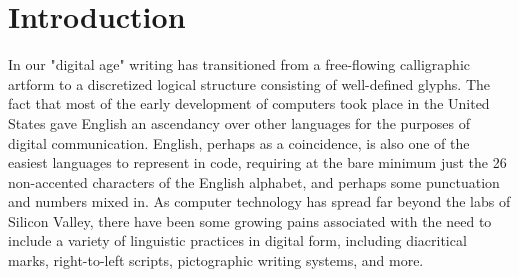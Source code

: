 \section{Introduction}

In our "digital age" writing has transitioned from a free-flowing calligraphic
artform to a discretized logical structure consisting of well-defined glyphs.
The fact that most of the early development of computers took place in the
United States gave English an ascendancy over other languages for the purposes
of digital communication. English, perhaps as a coincidence, is also one of the
easiest languages to represent in code, requiring at the bare minimum just the
26 non-accented characters of the English alphabet, and perhaps some punctuation
and numbers mixed in. As computer technology has spread far beyond the labs of
Silicon Valley, there have been some growing pains associated with the need to
include a variety of linguistic practices in digital form, including diacritical
marks, right-to-left scripts, pictographic writing systems, and more.
